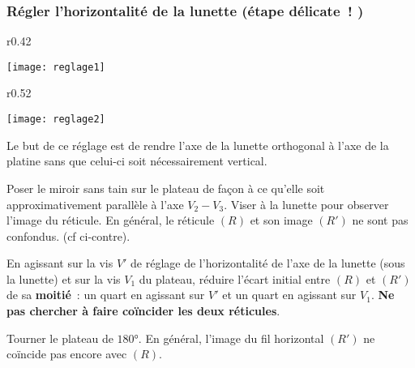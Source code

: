 \documentclass[a4paper, 12pt, final, garamond]{book}
\begin{document}
\subsubsection{Régler l'horizontalité de la lunette (étape délicate~! )}

\begin{wrapfigure}{r}{0.42\textwidth} 
\vspace{-30pt}

  \begin{center}
      \texttt{[image: reglage1]}
  \end{center}

  \vspace{-10pt}
  \vspace{1pt}
\end{wrapfigure} 

\begin{wrapfigure}{r}{0.52\textwidth} 
\vspace{-160pt}

  \begin{center}
      \texttt{[image: reglage2]}
  \end{center}

  \vspace{-20pt}
  \vspace{1pt}
\end{wrapfigure} 

Le but de ce réglage est de rendre l'axe de la lunette orthogonal à l'axe de la
platine sans que celui-ci soit nécessairement vertical.


 Poser le miroir sans tain sur le plateau de façon à ce qu'elle soit
approximativement parallèle à l'axe $V_2-V_3$. Viser à la lunette pour observer
l'image du réticule. En général, le réticule $(R)$ et son image $(R')$ ne sont
pas  confondus. (cf ci-contre).

\medskip

 En agissant sur la vis $V'$ de réglage de l'horizontalité de l'axe de
la lunette (sous la lunette) et sur la vis $V_1$ du plateau, réduire l'écart
initial entre $(R)$ et $(R')$ de sa \textbf{moitié}~: un quart en agissant sur
$V'$ et un quart en agissant sur $V_1$. \textbf{Ne pas chercher à faire
coïncider les deux réticules}.  

\medskip

 Tourner le plateau de $\ang{180;;}$. En général, l'image du fil
horizontal $(R')$ ne coïncide pas encore avec $(R)$. 

\medskip
\end{document}
